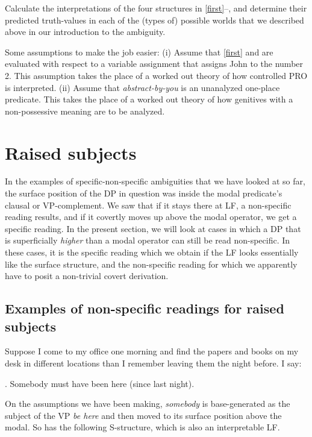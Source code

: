 \begin{exercise}
	
	Calculate the interpretations of the four structures in \ref{first}--\Last, and determine their predicted truth-values in each of the (types of) possible worlds that we described above in our introduction to the ambiguity.
	
	Some assumptions to make the job easier: (i) Assume that \ref{first} and \LLast are evaluated with respect to a variable assignment that assigns John to the number 2. This assumption takes the place of a worked out theory of how controlled PRO is interpreted. (ii) Assume that \emph{abstract-by-you} is an unanalyzed one-place predicate. This takes the place of a worked out theory of how genitives with a non-possessive meaning are to be analyzed. \eex
\end{exercise}

\section{Raised subjects}

In the examples of specific-non-specific ambiguities that we have looked at so far, the surface position of the DP in question was inside the modal predicate's clausal or VP-complement. We saw that if it stays there at LF, a non-specific reading results, and if it covertly moves up above the modal operator, we get a specific reading. In the present section, we will look at cases in which a DP that is superficially \emph{higher} than a modal operator can still be read non-specific. In these cases, it is the specific reading which we obtain if the LF looks essentially like the surface structure, and the non-specific reading for which we apparently have to posit a non-trivial covert derivation.

\subsection{Examples of non-specific readings for raised subjects}

Suppose I come to my office one morning and find the papers and books on my desk in different locations than I remember leaving them the night before. I say:

\ex. \label{some} Somebody must have been here (since last night).

On the assumptions we have been making, \emph{somebody} is base-generated as the subject of the VP \emph{be here} and then moved to its surface position above the modal. So \Last has the following S-structure, which is also an interpretable LF.

